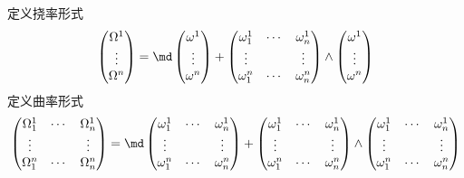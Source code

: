         定义挠率形式
        \begin{equation}\label{df:torsion-form}
            \begin{pmatrix}
                \Omega^1 \\ \vdots \\ \Omega^n
            \end{pmatrix} = 
            \md\begin{pmatrix}
                \omega^1 \\ \vdots \\ \omega^n
            \end{pmatrix} + 
            \begin{pmatrix}
                \omega^1_1 & \cdots & \omega^1_n \\
                \vdots & & \vdots \\
                \omega^n_1 & \cdots & \omega^n_n
            \end{pmatrix}\wedge
            \begin{pmatrix}
                \omega^1 \\ \vdots \\ \omega^n
            \end{pmatrix}
        \end{equation}
        定义曲率形式
        \begin{equation}\label{df:curvature-form}
            \begin{pmatrix}
                \Omega^1_1 & \cdots & \Omega^1_n \\ 
                \vdots & & \vdots \\ 
                \Omega^n_1 & \cdots & \Omega^n_n
            \end{pmatrix} = 
            \md\begin{pmatrix}
                \omega^1_1 & \cdots & \omega^1_n \\
                \vdots & & \vdots \\
                \omega^n_1 & \cdots & \omega^n_n
            \end{pmatrix} + 
            \begin{pmatrix}
                \omega^1_1 & \cdots & \omega^1_n \\
                \vdots & & \vdots \\
                \omega^n_1 & \cdots & \omega^n_n
            \end{pmatrix}\wedge
            \begin{pmatrix}
                \omega^1_1 & \cdots & \omega^1_n \\
                \vdots & & \vdots \\
                \omega^n_1 & \cdots & \omega^n_n
            \end{pmatrix}
        \end{equation}
